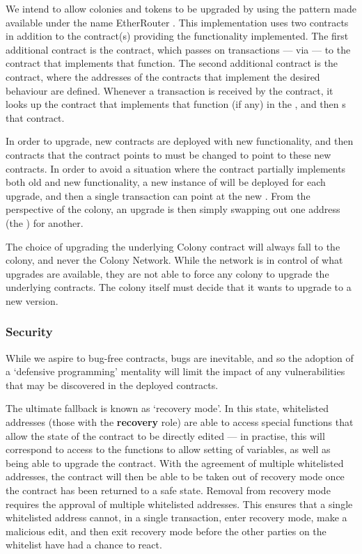 We intend to allow colonies and tokens to be upgraded by using the pattern made available under the name EtherRouter \cite{EtherRouter}. This implementation uses two contracts in addition to the contract(s) providing the functionality implemented. The first additional contract is the  contract, which passes on transactions --- via  --- to the contract that implements that function. The second additional contract is the  contract, where the addresses of the contracts that implement the desired behaviour are defined. Whenever a transaction is received by the  contract, it looks up the contract that implements that function (if any) in the , and then s that contract.

In order to upgrade, new contracts are deployed with new functionality, and then contracts that the  contract points to must be changed to point to these new contracts. In order to avoid a situation where the contract partially implements both old and new functionality,  a new instance of  will be deployed for each upgrade, and then a single transaction can point  at the new . From the perspective of the colony, an upgrade is then simply swapping out one address (the ) for another.

The choice of upgrading the underlying Colony contract will always fall to the colony, and never the Colony Network. While the network is in control of what upgrades are available, they are not able to force any colony to upgrade the underlying contracts. The colony itself must decide that it wants to upgrade to a new version.

\subsubsection{Security}

While we aspire to bug-free contracts, bugs are inevitable, and so the adoption of a `defensive programming' mentality will limit the impact of any vulnerabilities that may be discovered in the deployed contracts.

The ultimate fallback is known as `recovery mode'. In this state, whitelisted addresses (those with the \textbf{recovery} role) are able to access special functions that allow the state of the contract to be directly edited --- in practise, this will correspond to access to the functions to allow setting of variables, as well as being able to upgrade the contract. With the agreement of multiple whitelisted addresses, the contract will then be able to be taken out of recovery mode once the contract has been returned to a safe state. Removal from recovery mode requires the approval of multiple whitelisted addresses. This ensures that a single whitelisted address cannot, in a single transaction, enter recovery mode, make a malicious edit, and then exit recovery mode before the other parties on the whitelist have had a chance to react.


